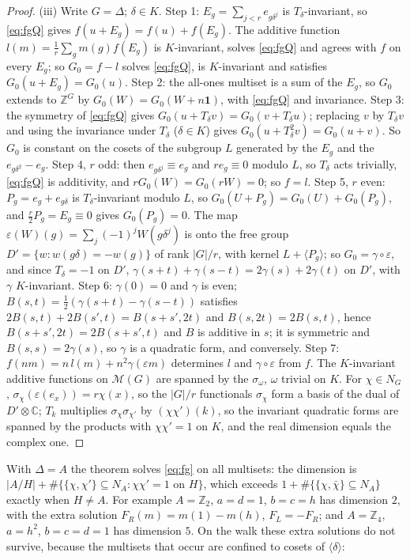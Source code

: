 \begin{proof}
(iii) Write $G=\Delta$; $\delta\in K$. Step 1: $E_g=\sum_{j<r}e_{g\delta^j}$ is $T_\delta$-invariant, so \eqref{eq:fgQ} gives $f(u+E_g)=f(u)+f(E_g)$. The additive function $l(m)=\frac1r\sum_g m(g)f(E_g)$ is $K$-invariant, solves \eqref{eq:fgQ} and agrees with $f$ on every $E_g$; so $G_0=f-l$ solves \eqref{eq:fgQ}, is $K$-invariant and satisfies $G_0(u+E_g)=G_0(u)$. Step 2: the all-ones multiset is a sum of the $E_g$, so $G_0$ extends to $\mathbb{Z}^G$ by $G_0(W)=G_0(W+n\mathbf 1)$, with \eqref{eq:fgQ} and invariance. Step 3: the symmetry of \eqref{eq:fgQ} gives $G_0(u+T_\delta v)=G_0(v+T_\delta u)$; replacing $v$ by $T_\delta v$ and using the invariance under $T_\delta$ ($\delta\in K$) gives $G_0(u+T_\delta^2v)=G_0(u+v)$. So $G_0$ is constant on the cosets of the subgroup $L$ generated by the $E_g$ and the $e_{g\delta^2}-e_g$. Step 4, $r$ odd: then $e_{g\delta^j}\equiv e_g$ and $re_g\equiv0$ modulo $L$, so $T_\delta$ acts trivially, \eqref{eq:fgQ} is additivity, and $rG_0(W)=G_0(rW)=0$; so $f=l$. Step 5, $r$ even: $P_g=e_g+e_{g\delta}$ is $T_\delta$-invariant modulo $L$, so $G_0(U+P_g)=G_0(U)+G_0(P_g)$, and $\frac r2P_g=E_g\equiv0$ gives $G_0(P_g)=0$. The map $\varepsilon(W)(g)=\sum_j(-1)^jW(g\delta^j)$ is onto the free group $D'=\{w:w(g\delta)=-w(g)\}$ of rank $|G|/r$, with kernel $L+\langle P_g\rangle$; so $G_0=\gamma\circ\varepsilon$, and since $T_\delta=-1$ on $D'$, $\gamma(s+t)+\gamma(s-t)=2\gamma(s)+2\gamma(t)$ on $D'$, with $\gamma$ $K$-invariant. Step 6: $\gamma(0)=0$ and $\gamma$ is even; $B(s,t)=\frac12(\gamma(s+t)-\gamma(s-t))$ satisfies $2B(s,t)+2B(s',t)=B(s+s',2t)$ and $B(s,2t)=2B(s,t)$, hence $B(s+s',2t)=2B(s+s',t)$ and $B$ is additive in $s$; it is symmetric and $B(s,s)=2\gamma(s)$, so $\gamma$ is a quadratic form, and conversely. Step 7: $f(nm)=n\,l(m)+n^2\gamma(\varepsilon m)$ determines $l$ and $\gamma\circ\varepsilon$ from $f$. The $K$-invariant additive functions on $\mathcal{M}(G)$ are spanned by the $\sigma_\omega$, $\omega$ trivial on $K$. For $\chi\in N_G$, $\sigma_\chi(\varepsilon(e_x))=r\chi(x)$, so the $|G|/r$ functionals $\sigma_\chi$ form a basis of the dual of $D'\otimes\mathbb{C}$; $T_k$ multiplies $\sigma_\chi\sigma_{\chi'}$ by $(\chi\chi')(k)$, so the invariant quadratic forms are spanned by the products with $\chi\chi'=1$ on $K$, and the real dimension equals the complex one.
\end{proof}

With $\Delta=A$ the theorem solves \eqref{eq:fg} on all multisets: the dimension is $|A/H|+\#\{\{\chi,\chi'\}\subseteq N_A:\chi\chi'=1\text{ on }H\}$, which exceeds $1+\#\{\{\chi,\bar\chi\}\subseteq N_A\}$ exactly when $H\ne A$. For example $A=\mathbb{Z}_2$, $a=d=1$, $b=c=h$ has dimension $2$, with the extra solution $F_R(m)=m(1)-m(h)$, $F_L=-F_R$; and $A=\mathbb{Z}_4$, $a=h^2$, $b=c=d=1$ has dimension $5$. On the walk these extra solutions do not survive, because the multisets that occur are confined to cosets of $\langle\delta\rangle$:

